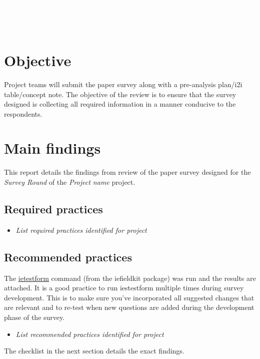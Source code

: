 \documentclass{report}
\newcommand{\titleBox}[1]{
	\begin{tcolorbox}
		[colframe = fontcolor,
		colback = fontcolor,
		sharp corners,
		halign = flush center,
		valign = center,
		height = 0.2\textwidth,
		after skip = 1cm]
		#1
	\end{tcolorbox}
}
\begin{document}
	
	
	\titleBox{
		\textcolor{white}{\Large{Project: Name}} \\
		\textcolor{white}{\Large{Survey: Round}} \\
		\textcolor{white}{\Large{DIME Analytics Paper Survey Review Checklist}}
	}

		\section{Objective}
		Project teams will submit the paper survey along with a pre-analysis plan/i2i table/concept note. The objective of the review is to ensure that the survey designed is collecting all required information in a manner conducive to the respondents.

	\section*{Main findings}

This report details the findings from review of the paper survey designed for the \textit{Survey Round}  of the \textit{Project name} project.

\subsection*{Required practices}
\begin{itemize}
	\item \textit{List required practices identified for project}
\end{itemize} 
\subsection*{Recommended practices}

The \href{https://dimewiki.worldbank.org/Ietestform}{ietestform} command (from the iefieldkit package) was run and the results are attached. It is a good practice to run iestestform multiple times during survey development. This is to make sure you’ve incorporated all suggested changes that are relevant and to re-test when new questions are added during the development phase of the survey.
\begin{itemize}
	\item \textit{List recommended practices identified for project}
\end{itemize}

The checklist in the next section details the exact findings.
\newpage 
\end{document}
